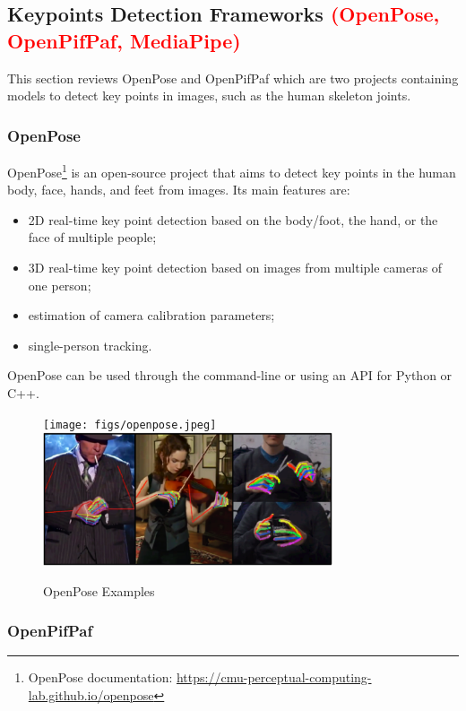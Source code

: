 \subsection{Keypoints Detection Frameworks \textcolor{red}{(OpenPose, OpenPifPaf, MediaPipe)}}
\label{subsection:keypointdetection}

This section reviews OpenPose and OpenPifPaf which are two projects containing models to detect key points in images, such as the human skeleton joints.

\subsubsection{OpenPose}

OpenPose\cite{Cao2021,Simon2017,Cao2018,Wei2016}\footnote{OpenPose documentation: \url{https://cmu-perceptual-computing-lab.github.io/openpose}} is an open-source project that aims to detect key points in the human body, face, hands, and feet from images. Its main features are:

\begin{itemize}
    \item 2D real-time key point detection based on the body/foot, the hand, or the face of multiple people;
    \item 3D real-time key point detection based on images from multiple cameras of one person;
    \item estimation of camera calibration parameters;
    \item single-person tracking.
\end{itemize}

OpenPose can be used through the command-line or using an API for Python or C++.

\begin{figure}[h]
\centerline{\texttt{[image: figs/openpose.jpeg]}\includegraphics[height=1.55in]{figs/openpose2.PNG}}
\caption[OpenPose Examples]{OpenPose Examples \cite{Cao2021,Simon2017}}
\label{openpose}
\end{figure}

\subsubsection{OpenPifPaf}

